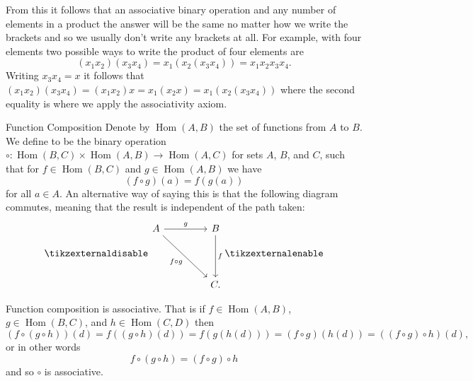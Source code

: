 \documentclass[fleqn]{NotesClass}
\DeclareMathOperator{\Hom}{Hom}
\begin{document}
    From this it follows that an associative binary operation and any number of elements in a product the answer will be the same no matter how we write the brackets and so we usually don't write any brackets at all.
    For example, with four elements two possible ways to write the product of four elements are
    \begin{equation}
        (x_1 x_2) (x_3 x_4) = x_1(x_2(x_3x_4)) = x_1 x_2 x_3 x_4.
    \end{equation}
    Writing \(x_3x_4 = x\) it follows that \((x_1x_2)(x_3x_4) = (x_1x_2)x = x_1(x_2x) = x_1(x_2(x_3x_4))\) where the second equality is where we apply the associativity axiom.
    
    \begin{exm}{Function Composition}{}
        Denote by \(\Hom(A, B)\) the set of functions from \(A\) to \(B\).
        We define  to be the binary operation \(\circ\colon \Hom(B, C) \times \Hom(A, B) \to \Hom(A, C)\) for sets \(A\), \(B\), and \(C\), such that for \(f \in \Hom(B, C)\) and \(g \in \Hom(A, B)\) we have
        \begin{equation}
            (f \circ g)(a) = f(g(a))
        \end{equation}
        for all \(a \in A\).
        An alternative way of saying this is that the following diagram commutes, meaning that the result is independent of the path taken:
        \begin{equation}
            \tikzexternaldisable
            \begin{tikzcd}[row sep=1.5cm, column sep=1.5cm]
                A \ar[r, "g"] \ar[dr, "f \circ g", swap] & B \ar[d, "f"] \\
                & C.
            \end{tikzcd}
            \tikzexternalenable
        \end{equation}
        
        Function composition is associative.
        That is if \(f \in \Hom(A, B)\), \(g \in \Hom(B, C)\), and \(h \in \Hom(C, D)\) then
        \begin{equation*}
            (f \circ (g \circ h))(d) = f((g\circ h)(d)) = f(g(h(d))) = (f\circ g)(h(d)) = ((f\circ g)\circ h)(d),
        \end{equation*}
        or in other words
        \begin{equation}
            f \circ (g \circ h) = (f \circ g) \circ h
        \end{equation}
        and so \(\circ\) is associative.
        

\end{exm}
\end{document}
